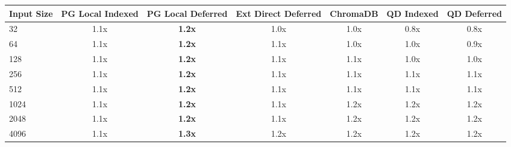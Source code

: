 \begin{tabular}{lcccccc}
\toprule
\textbf{Input Size} & \textbf{PG Local Indexed} & \textbf{PG Local Deferred} & \textbf{Ext Direct Deferred} & \textbf{ChromaDB} & \textbf{QD Indexed} & \textbf{QD Deferred} \\
\midrule
32 & 1.1x & \textbf{1.2x} & 1.0x & 1.0x & 0.8x & 0.8x \\
64 & 1.1x & \textbf{1.2x} & 1.1x & 1.0x & 1.0x & 0.9x \\
128 & 1.1x & \textbf{1.2x} & 1.1x & 1.1x & 1.0x & 1.0x \\
256 & 1.1x & \textbf{1.2x} & 1.1x & 1.1x & 1.1x & 1.1x \\
512 & 1.1x & \textbf{1.2x} & 1.1x & 1.1x & 1.1x & 1.1x \\
1024 & 1.1x & \textbf{1.2x} & 1.1x & 1.2x & 1.2x & 1.2x \\
2048 & 1.1x & \textbf{1.2x} & 1.1x & 1.2x & 1.2x & 1.2x \\
4096 & 1.1x & \textbf{1.3x} & 1.2x & 1.2x & 1.2x & 1.2x \\
\bottomrule
\end{tabular}
